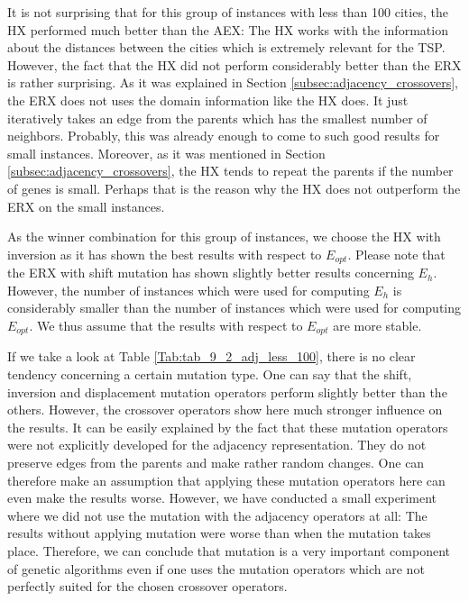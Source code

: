 It is not surprising that for this group of instances with less than 100 cities, the HX performed much better than the AEX: The HX works with the information about the distances between the cities which is extremely relevant for the TSP. However, the fact that the HX did not perform considerably better than the ERX is rather surprising. As it was explained in Section  \ref{subsec:adjacency_crossovers}, the ERX does not uses the domain information like the HX does. It just iteratively takes an edge from the parents which has the smallest number of neighbors. Probably, this was already enough to come to such good results for small instances. Moreover, as it was mentioned in Section \ref{subsec:adjacency_crossovers}, the HX tends to repeat the parents if the number of genes is small. Perhaps that is the reason why the HX does not outperform the ERX on the small instances. \par 

As the winner combination for this group of instances, we choose the HX with inversion as it has shown the best results with respect to $E_{opt}$. Please note that the ERX with shift mutation has shown slightly better results concerning $E_{h}$. However, the number of instances which were used for computing $E_{h}$ is considerably smaller than the number of instances which were used for computing $E_{opt}$. We thus assume that the results with respect to $E_{opt}$ are more stable.\par 

If we take a look at Table \ref{Tab:tab_9_2_adj_less_100}, there is no clear tendency concerning a certain mutation type. One can say that the shift,  inversion and displacement mutation operators perform slightly better than the others. However, the crossover operators show here much stronger influence on the results. It can be easily explained by the fact that these mutation operators were not explicitly developed for the adjacency representation. They do not preserve edges from the parents and make rather random changes. One can therefore make an assumption that applying these mutation operators here can even make the results worse. However, we have conducted a small experiment where we did not use the mutation with the adjacency operators at all: The results without applying mutation were worse than when the mutation takes place. Therefore, we can conclude that mutation is a very important component of genetic algorithms even if one uses the mutation operators which are not perfectly suited for the chosen crossover operators. \par 

